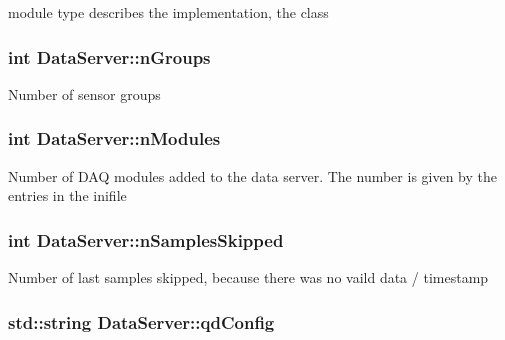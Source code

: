 module type describes the implementation, the class \hypertarget{classDataServer_a6ef6ff1d012d3d199bd2d4ea2889e1fc}{
\subsubsection[{n\-Groups}]{\setlength{\rightskip}{0pt plus 5cm}int Data\-Server\-::n\-Groups\hspace{0.3cm}{\ttfamily [private]}}}\label{classDataServer_a6ef6ff1d012d3d199bd2d4ea2889e1fc}
Number of sensor groups \hypertarget{classDataServer_a099becd424d2c231270d8bf7682f86f7}{
\subsubsection[{n\-Modules}]{\setlength{\rightskip}{0pt plus 5cm}int Data\-Server\-::n\-Modules\hspace{0.3cm}{\ttfamily [private]}}}\label{classDataServer_a099becd424d2c231270d8bf7682f86f7}
Number of D\-A\-Q modules added to the data server. The number is given by the entries in the inifile \hypertarget{classDataServer_a63d42e1d7442a10dfcb4416b22e3cd94}{
\subsubsection[{n\-Samples\-Skipped}]{\setlength{\rightskip}{0pt plus 5cm}int Data\-Server\-::n\-Samples\-Skipped\hspace{0.3cm}{\ttfamily [private]}}}\label{classDataServer_a63d42e1d7442a10dfcb4416b22e3cd94}
Number of last samples skipped, because there was no vaild data / timestamp \hypertarget{classDataServer_a66169555f6156b14a11d88110660189d}{
\subsubsection[{qd\-Config}]{\setlength{\rightskip}{0pt plus 5cm}std\-::string Data\-Server\-::qd\-Config\hspace{0.3cm}{\ttfamily [private]}}}\label{classDataServer_a66169555f6156b14a11d88110660189d}
